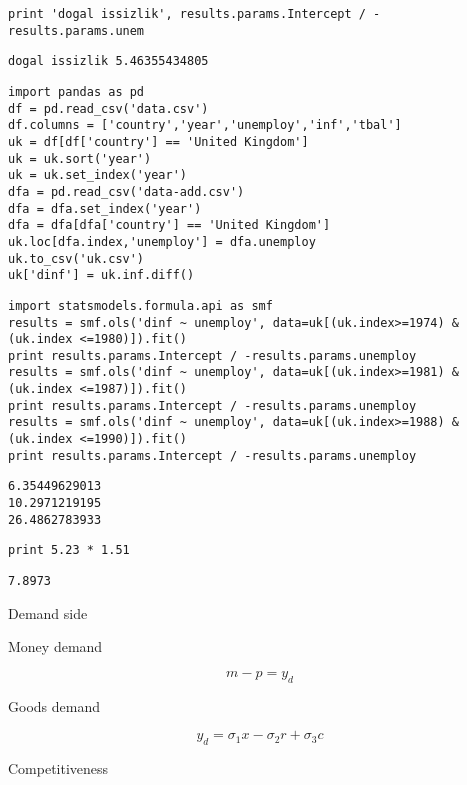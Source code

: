 \documentclass[12pt,fleqn]{article}\usepackage{../../common}
\begin{document}
\begin{verbatim}
print 'dogal issizlik', results.params.Intercept / -results.params.unem
\end{verbatim}

\begin{verbatim}
dogal issizlik 5.46355434805
\end{verbatim}

\begin{verbatim}
import pandas as pd
df = pd.read_csv('data.csv')
df.columns = ['country','year','unemploy','inf','tbal']
uk = df[df['country'] == 'United Kingdom']
uk = uk.sort('year')
uk = uk.set_index('year')
dfa = pd.read_csv('data-add.csv')
dfa = dfa.set_index('year')
dfa = dfa[dfa['country'] == 'United Kingdom']
uk.loc[dfa.index,'unemploy'] = dfa.unemploy
uk.to_csv('uk.csv')
uk['dinf'] = uk.inf.diff()
\end{verbatim}


\begin{verbatim}
import statsmodels.formula.api as smf
results = smf.ols('dinf ~ unemploy', data=uk[(uk.index>=1974) & (uk.index <=1980)]).fit()
print results.params.Intercept / -results.params.unemploy
results = smf.ols('dinf ~ unemploy', data=uk[(uk.index>=1981) & (uk.index <=1987)]).fit()
print results.params.Intercept / -results.params.unemploy
results = smf.ols('dinf ~ unemploy', data=uk[(uk.index>=1988) & (uk.index <=1990)]).fit()
print results.params.Intercept / -results.params.unemploy
\end{verbatim}

\begin{verbatim}
6.35449629013
10.2971219195
26.4862783933
\end{verbatim}

\begin{verbatim}
print 5.23 * 1.51
\end{verbatim}

\begin{verbatim}
7.8973
\end{verbatim}
Demand side

Money demand

%
$$ m - p = y_d $$

Goods demand

%
$$ y_d = \sigma_1x - \sigma_2 r + \sigma_3 c  $$

Competitiveness
\end{document}
